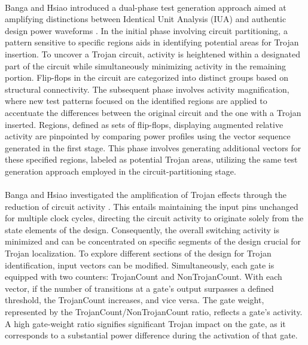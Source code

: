 \paragraph*{}
Banga and Hsiao introduced a dual-phase test generation approach aimed at amplifying distinctions between Identical Unit Analysis (IUA) and authentic design power waveforms \cite{banga2008region}. In the initial phase involving circuit partitioning, a pattern sensitive to specific regions aids in identifying potential areas for Trojan insertion. To uncover a Trojan circuit, activity is heightened within a designated part of the circuit while simultaneously minimizing activity in the remaining portion. Flip-flops in the circuit are categorized into distinct groups based on structural connectivity. The subsequent phase involves activity magnification, where new test patterns focused on the identified regions are applied to accentuate the differences between the original circuit and the one with a Trojan inserted. Regions, defined as sets of flip-flops, displaying augmented relative activity are pinpointed by comparing power profiles using the vector sequence generated in the first stage. This phase involves generating additional vectors for these specified regions, labeled as potential Trojan areas, utilizing the same test generation approach employed in the circuit-partitioning stage.
\paragraph*{}
Banga and Hsiao investigated the amplification of Trojan effects through the reduction of circuit activity \cite{banga2009novel}. This entails maintaining the input pins unchanged for multiple clock cycles, directing the circuit activity to originate solely from the state elements of the design. Consequently, the overall switching activity is minimized and can be concentrated on specific segments of the design crucial for Trojan localization. To explore different sections of the design for Trojan identification, input vectors can be modified. Simultaneously, each gate is equipped with two counters: TrojanCount and NonTrojanCount. With each vector, if the number of transitions at a gate's output surpasses a defined threshold, the TrojanCount increases, and vice versa. The gate weight, represented by the TrojanCount/NonTrojanCount ratio, reflects a gate's activity. A high gate-weight ratio signifies significant Trojan impact on the gate, as it corresponds to a substantial power difference during the activation of that gate.
